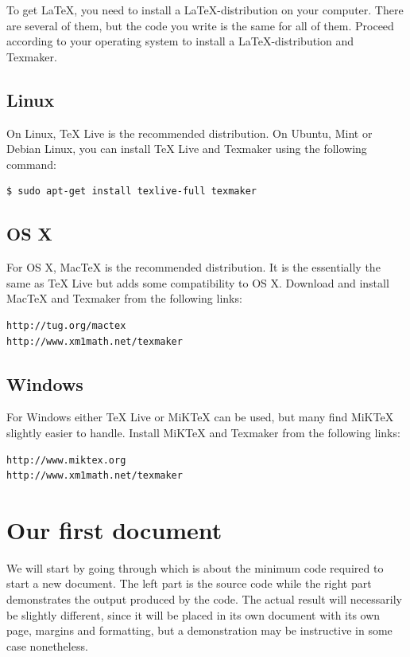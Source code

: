 To get \LaTeX{}, you need to install a \LaTeX{}-distribution on your computer. There are several of them, but the code you write is the same for all of them. Proceed according to your operating system to install a \LaTeX-distribution and Texmaker.

\subsection{Linux}
On Linux, TeX Live is the recommended distribution. On Ubuntu, Mint or Debian Linux, you can install TeX Live and Texmaker using the following command:
\begin{verbatim}
$ sudo apt-get install texlive-full texmaker
\end{verbatim}

\subsection{OS X}
For OS X, MacTeX is the recommended distribution. It is the essentially the same as TeX Live but adds some compatibility to OS X. Download and install MacTeX and Texmaker from the following links:

\begin{verbatim}
http://tug.org/mactex
http://www.xm1math.net/texmaker
\end{verbatim}

\subsection{Windows}
For Windows either TeX Live or MiKTeX can be used, but many find MiKTeX slightly easier to handle. Install MiKTeX and Texmaker from the following links:

\begin{verbatim}
http://www.miktex.org
http://www.xm1math.net/texmaker
\end{verbatim}

\section{Our first document}
We will start by going through  which is about the minimum code required to start a new document. The left part is the source code while the right part demonstrates the output produced by the code. The actual result will necessarily be slightly different, since it will be placed in its own document with its own page, margins and formatting, but a demonstration may be instructive in some case nonetheless.

